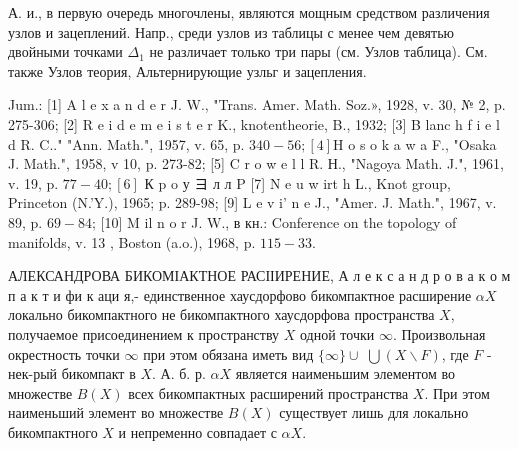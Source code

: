 \documentclass[10pt]{article}
\begin{document}
А. и., в первую очередь многочлены, являются мощным средством различения узлов и зацеплений. Напр., среди узлов из таблицы с менее чем девятью двойными точками $\Delta_{1}$ не различает только три пары (см. Узлов таблица). См. также Узлов теория, Альтернирующие узльг и зацепления.



Jum.: [1] A l e x a n d e r J. W., "Trans. Amer. Math. Soz.», 1928, v. 30, № 2, p. 275-306; [2] R e i d e m e i s t e r K., knotentheorie, B., 1932; [3] B lanc h f i e l d R. C.." "Ann. Math.", 1957, v. 65, p. $340-56 ;[4] \mathrm{H}$ o s o k a w a F., "Osaka J. Math.", 1958, v 10, p. 273-82; [5] C r o w e l l R. Н., "Nagoya Math. J.", 1961, v. 19, p. $77-40 ;[6]$ К p o у ヨ л л P [7] N e u w irt h L., Knot group, Princeton (N.'Y.), 1965; p. 289-98; [9] L e v i' n e J., "Amer. J. Math.", 1967, v. 89, p. $69-84$; [10] M il n o r J. W., в кн.: Conference on the topology of manifolds, v. 13 , Boston (a.o.), 1968, p. $115-33$.



АЛЕКСАНДРОВА БИКОМІАКТНОЕ РАСІІИРЕНИЕ, А л е к с а н д р о в а к о м п а к т и фи к аци я,- единственное хаусдорфово бикомпактное расширение $\alpha X$ локально бикомпактного не бикомпактного хаусдорфова пространства $X$, получаемое присоединением к пространству $X$ одной точки $\infty$. Произвольная окрестность точки $\infty$ при этом обязана иметь вид $\{\infty\} \cup$ $\bigcup(X \backslash F)$, где $F$ - нек-рый бикомпакт в $X$. А. б. р. $\alpha X$ является наименьшим элементом во множестве $B(X)$ всех бикомпактных расширений пространства $X$. При этом наименьший элемент во множестве $B(X)$ существует лишь для локально бикомпактного $X$ и непременно совпадает с $\alpha X$.
\end{document}
